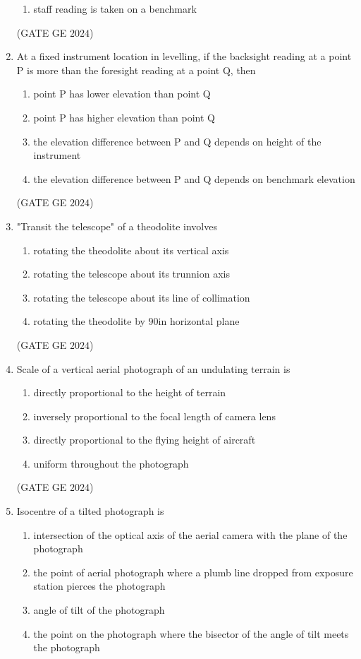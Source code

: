 \documentclass[journal,12pt,onecolumn]{IEEEtran}
\theoremstyle{remark}
\begin{document}
\begin{enumerate}
\begin{enumerate}
\item staff reading is taken on a benchmark
\end{enumerate}
\hfill{(GATE GE $2024$)}
\bigskip
\item At a fixed instrument location in levelling, if the backsight reading at a point 
P is more than the foresight reading at a point Q, then
\begin{enumerate}
\item point P has lower elevation than point Q
\item point P has higher elevation than point Q
\item the elevation difference between P and Q depends on height of the instrument
\item the elevation difference between P and Q depends on benchmark elevation
\end{enumerate}
\hfill{(GATE GE $2024$)}
\bigskip
\item "Transit the telescope" of a theodolite involves
\begin{enumerate}
\item rotating the theodolite about its vertical axis
\item rotating the telescope about its trunnion axis
\item rotating the telescope about its line of collimation
\item rotating the theodolite by $90$\degree in horizontal plane
\end{enumerate}
\hfill{(GATE GE $2024$)}
\bigskip
\item Scale of a vertical aerial photograph of 
an undulating terrain is
\begin{enumerate}
\item directly proportional to the height of terrain
\item inversely proportional to the focal length of camera lens
\item directly proportional to the flying height of aircraft
\item uniform throughout the photograph
\end{enumerate}
\hfill{(GATE GE $2024$)}
\bigskip
\item Isocentre of a tilted photograph is
\begin{enumerate}
\item intersection of the optical axis of the aerial camera with the plane of the photograph
\item the point of aerial photograph where a plumb line dropped from exposure station pierces the photograph
\item angle of tilt of the photograph
\item the point on the photograph where the bisector of the angle of tilt meets the photograph
\end{enumerate}
\end{enumerate}
\end{document}

